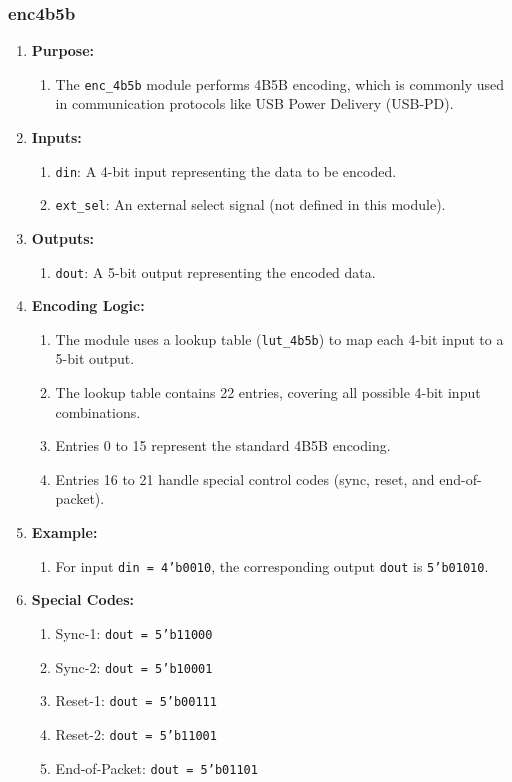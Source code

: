 \subsubsection{enc\textunderscore4b5b }
\begin{enumerate}
    \item \textbf{Purpose:}
    \begin{enumerate}
        \item The \texttt{enc\_4b5b} module performs 4B5B encoding, which is commonly used in communication protocols like USB Power Delivery (USB-PD).
    \end{enumerate}

    \item \textbf{Inputs:}
    \begin{enumerate}
        \item \texttt{din}: A 4-bit input representing the data to be encoded.
        \item \texttt{ext\_sel}: An external select signal (not defined in this module).
    \end{enumerate}

    \item \textbf{Outputs:}
    \begin{enumerate}
        \item \texttt{dout}: A 5-bit output representing the encoded data.
    \end{enumerate}

    \item \textbf{Encoding Logic:}
    \begin{enumerate}
        \item The module uses a lookup table (\texttt{lut\_4b5b}) to map each 4-bit input to a 5-bit output.
        \item The lookup table contains 22 entries, covering all possible 4-bit input combinations.
        \item Entries 0 to 15 represent the standard 4B5B encoding.
        \item Entries 16 to 21 handle special control codes (sync, reset, and end-of-packet).
    \end{enumerate}

    \item \textbf{Example:}
    \begin{enumerate}
        \item For input \texttt{din = 4'b0010}, the corresponding output \texttt{dout} is \texttt{5'b01010}.
    \end{enumerate}

    \item \textbf{Special Codes:}
    \begin{enumerate}
        \item Sync-1: \texttt{dout = 5'b11000}
        \item Sync-2: \texttt{dout = 5'b10001}
        \item Reset-1: \texttt{dout = 5'b00111}
        \item Reset-2: \texttt{dout = 5'b11001}
        \item End-of-Packet: \texttt{dout = 5'b01101}
    \end{enumerate}
\end{enumerate}
